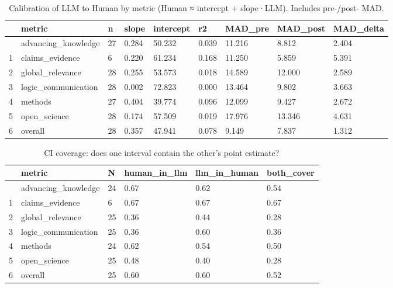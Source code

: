 \documentclass[
  11pt,
  letterpaper,
  DIV=11,
  numbers=noendperiod]{scrreprt}
\begin{document}
\begin{longtable}[]{@{}lllllllll@{}}

\caption{\label{tbl-calibration}Calibration of LLM to Human by metric
(Human ≈ intercept + slope·LLM). Includes pre-/post- MAD.}

\tabularnewline

\toprule\noalign{}
& metric & n & slope & intercept & r2 & MAD\_pre & MAD\_post &
MAD\_delta \\
\midrule\noalign{}
\endhead
\bottomrule\noalign{}
\endlastfoot
0 & advancing\_knowledge & 27 & 0.284 & 50.232 & 0.039 & 11.216 & 8.812
& 2.404 \\
1 & claims\_evidence & 6 & 0.220 & 61.234 & 0.168 & 11.250 & 5.859 &
5.391 \\
2 & global\_relevance & 28 & 0.255 & 53.573 & 0.018 & 14.589 & 12.000 &
2.589 \\
3 & logic\_communication & 28 & 0.002 & 72.823 & 0.000 & 13.464 & 9.802
& 3.663 \\
4 & methods & 27 & 0.404 & 39.774 & 0.096 & 12.099 & 9.427 & 2.672 \\
5 & open\_science & 28 & 0.174 & 57.509 & 0.019 & 17.976 & 13.346 &
4.631 \\
6 & overall & 28 & 0.357 & 47.941 & 0.078 & 9.149 & 7.837 & 1.312 \\

\end{longtable}

\begin{longtable}[]{@{}llllll@{}}

\caption{\label{tbl-coverage}CI coverage: does one interval contain the
other's point estimate?}

\tabularnewline

\toprule\noalign{}
& metric & N & human\_in\_llm & llm\_in\_human & both\_cover \\
\midrule\noalign{}
\endhead
\bottomrule\noalign{}
\endlastfoot
0 & advancing\_knowledge & 24 & 0.67 & 0.62 & 0.54 \\
1 & claims\_evidence & 6 & 0.67 & 0.67 & 0.67 \\
2 & global\_relevance & 25 & 0.36 & 0.44 & 0.28 \\
3 & logic\_communication & 25 & 0.36 & 0.60 & 0.36 \\
4 & methods & 24 & 0.62 & 0.54 & 0.50 \\
5 & open\_science & 25 & 0.48 & 0.40 & 0.28 \\
6 & overall & 25 & 0.60 & 0.60 & 0.52 \\

\end{longtable}
\end{document}
